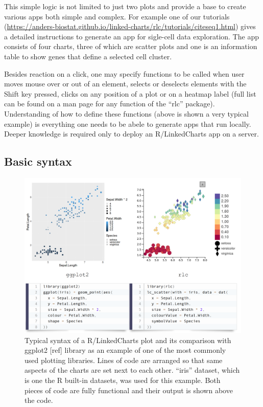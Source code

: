 \documentclass[twocolumn,10pt]{article}
\begin{document}
This simple logic is not limited to just two plots and provide a base to create various apps both simple and complex. For example one of our tutorials (\url{https://anders-biostat.github.io/linked-charts/rlc/tutorials/citeseq1.html}) gives a detailed instructions to generate an app for sigle-cell data exploration. The app consists of four charts, three of which are scatter plots and one is an information table to show genes that define a selected cell cluster.

Besides reaction on a click, one may specify functions to be called when user moves mouse over or out of an element, selects or deselects elements with the Shift key pressed, clicks on any position of a plot or on a heatmap label (full list can be found on a man page for any function of the ``rlc'' package). Understanding of how to define these functions (above is shown a very typical example) is everything one needs to be abele to generate apps that run locally. Deeper knowledge is required only to deploy an R/LinkedCharts app on a server. 

\subsection{Basic syntax}

\begin{figure}
	\includegraphics[width=\textwidth]{FigB/figB.png}
	\caption{Typical syntax of a R/LinkedCharts plot and its comparison with ggplot2 [ref] library as an example of one of the most commonly used plotting libraries. Lines of code are arranged so that same aspects of the charts are set next to each other. ``iris'' dataset, which is one the R built-in datasets, was used for this example. Both pieces of code are fully functional and their output is shown above the code.}
	\label{FigB}
\end{figure}
\end{document}
